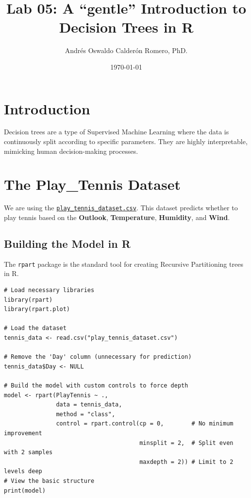 \documentclass{article}
\title{Lab 05: A ``gentle'' Introduction to Decision Trees in R}
\author{Andrés Oswaldo Calderón Romero, PhD.}
\date{\today}
\begin{document}
\maketitle

\section{Introduction}
Decision trees are a type of Supervised Machine Learning where the data is continuously split according to specific parameters. They are highly interpretable, mimicking human decision-making processes.

\section{The Play\_Tennis Dataset}
We are using the \href{https://drive.google.com/file/d/1oxH5tVJkF2An3O5m80sbYNexTnE1xaeF/view?usp=sharing}{\texttt{play\_tennis\_dataset.csv}}. This dataset predicts whether to play tennis based on the \textbf{Outlook}, \textbf{Temperature}, \textbf{Humidity}, and \textbf{Wind}.

\subsection{Building the Model in R}
The \texttt{rpart} package is the standard tool for creating Recursive Partitioning trees in R.

\begin{listing}[H]
\begin{verbatim}
# Load necessary libraries
library(rpart)
library(rpart.plot)

# Load the dataset
tennis_data <- read.csv("play_tennis_dataset.csv")

# Remove the 'Day' column (unnecessary for prediction)
tennis_data$Day <- NULL

# Build the model with custom controls to force depth
model <- rpart(PlayTennis ~ .,
               data = tennis_data,
               method = "class",
               control = rpart.control(cp = 0,        # No minimum improvement
                                       minsplit = 2,  # Split even with 2 samples
                                       maxdepth = 2)) # Limit to 2 levels deep
# View the basic structure
print(model)
\end{verbatim}
\caption{Model construction using \texttt{rpart}.}
\end{listing}
\end{document}
